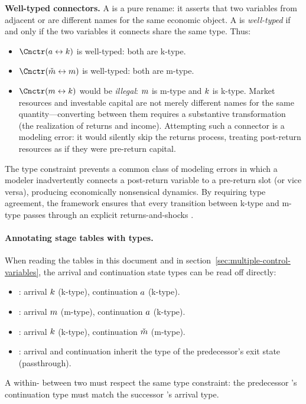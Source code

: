 \noindent \textbf{Well-typed connectors.}
A {\Cnct} is a pure rename: it asserts that two variables from adjacent
{\stgs} or {\intervals} are different names for the same economic object.
A {\Cnct} is \textit{well-typed} if and only if the two variables it
connects share the same type. Thus:
\begin{itemize}
  \item $\Cnctr(\aNrm \leftrightarrow \kNrm)$ is well-typed: both are
    k-type.
  \item $\Cnctr(\check{\mNrm} \leftrightarrow \mNrm)$ is well-typed:
    both are m-type.
  \item $\Cnctr(\mNrm \leftrightarrow \kNrm)$ would be \textit{illegal}:
    $m$ is m-type and $k$ is k-type. Market resources and
    investable capital are not merely different names for the same
    quantity---converting between them requires a substantive
    transformation (the realization of returns and income). Attempting
    such a connector is a modeling error: it would silently skip the
    returns process, treating post-return resources as if they were
    pre-return capital.
\end{itemize}

\noindent The type constraint prevents a common class of modeling errors
in which a modeler inadvertently connects a post-return variable to a
pre-return slot (or vice versa), producing economically nonsensical
dynamics. By requiring type agreement, the framework ensures that every
transition between k-type and m-type passes through an explicit
returns-and-shocks {\stg}.

\paragraph{Annotating stage tables with types.}
When reading the {\prch} tables in this document and in
section~\ref{sec:multiple-control-variables}, the arrival and continuation
state types can be read off directly:
\begin{itemize}
  \item {}: arrival $k$ (k-type),
    continuation $a$ (k-type).
  \item {}: arrival $m$ (m-type),
    continuation $a$ (k-type).
  \item {}: arrival $k$ (k-type),
    continuation $\check{m}$ (m-type).
  \item {}: arrival and continuation inherit the type of
    the predecessor's exit state (passthrough).
\end{itemize}
A within-{\interval} {\Cnct} between two {\stgs} must respect the same
type constraint: the predecessor {\stg}'s continuation type must match
the successor {\stg}'s arrival type.


